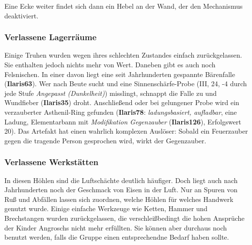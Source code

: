 \spaltenende


\spaltenanfang

Eine Ecke weiter findet sich dann ein Hebel an der Wand, der den Mechanismus deaktiviert.


\subsubsection{Verlassene Lagerräume}
Einige Truhen wurden wegen ihres schlechten Zustandes einfach zurückgelassen. 
Sie enthalten jedoch nichts mehr von Wert.
Daneben gibt es auch noch Felsnischen.
In einer davon liegt eine seit Jahrhunderten gespannte Bärenfalle (\textbf{Ilaris63}).
Wer nach Beute sucht und eine Sinnenschärfe-Probe (III, 24, -4 durch jede Stufe \emph{Angepasst (Dunkelheit)}) misslingt, schnappt die Falle zu und Wundfieber (\textbf{Ilaris35}) droht.
Anschließend oder bei gelungener Probe wird ein verzauberter Asthenil-Ring gefunden (\textbf{Ilaris78}: \emph{ladungsbasiert, aufladbar}, eine Ladung, Elementarbann mit \emph{Modifikation Gegenzauber} (\textbf{Ilaris126}), Erfolgswert 20).
Das Artefakt hat einen wahrlich komplexen Auslöser: Sobald ein Feuerzauber gegen die tragende Person gesprochen wird, wirkt der Gegenzauber.

\subsubsection{Verlassene Werkstätten}
In diesen Höhlen sind die Luftschächte deutlich häufiger. Doch liegt auch nach Jahrhunderten noch der Geschmack von Eisen in der Luft.
Nur an Spuren von Ruß und Abfällen lassen sich zuordnen, welche Höhlen für welches Handwerk genutzt wurde.
Einige einfache Werkzeuge wie Ketten, Hammer und Brechstangen wurden zurückgelassen, die verschleißbedingt die hohen Ansprüche der Kinder Angroschs nicht mehr erfüllten. Sie können aber durchaus noch benutzt werden, falls die Gruppe einen entsprechendne Bedarf haben sollte.

